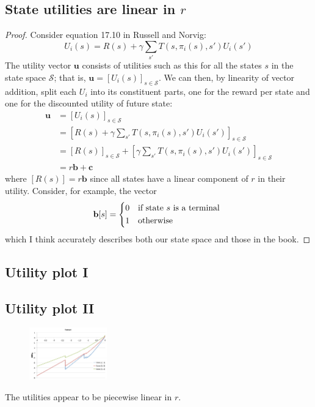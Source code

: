 \documentclass[letterpaper, 10pt]{article}
\begin{document}
\begin{multicols*}{2}
\subsection{State utilities are linear in $r$}
\begin{proof}
Consider equation 17.10 in Russell and Norvig:
\[ U_i(s) = R(s) + \gamma \sum_{s'} T(s, \pi_i(s), s') U_i(s') \]
The utility vector $\mathbf{u}$ consists of utilities such as this for all the states $s$ in the state space $\mathcal{S}$; that is, $\mathbf{u} = [U_i(s)]_{s \in \mathcal{S}}$.
We can then, by linearity of vector addition, split each $U_i$ into its constituent parts, one for the reward per state and one for the discounted utility of future state:
\begin{align*}
\mathbf{u} &= [U_i(s)]_{s \in \mathcal{S}} \\
&= \left[ R(s) + \gamma \sum_{s'} T(s, \pi_i(s), s') U_i(s') \right]_{s \in \mathcal{S}} \\
&= [R(s)]_{s \in \mathcal{S}} + \left[ \gamma \sum_{s'} T(s, \pi_i(s), s') U_i(s') \right]_{s \in \mathcal{S}} \\
&= r\mathbf{b} + \mathbf{c}
\end{align*}
where $[R(s)] = r\mathbf{b}$ since all states have a linear component of $r$ in their utility. 
Consider, for example, the vector
\[
\mathbf{b}[s] = \begin{dcases*}
0 & if state $s$ is a terminal \\
1 & otherwise
\end{dcases*}
\]
which I think accurately describes both our state space and those in the book.
\end{proof}

\subsection{Utility plot I}


\subsection{Utility plot II}
\begin{figure}[h]
	\centering
	\includegraphics[width=0.3\textwidth]{prob15}
	\caption{}
	\label{fig:prob15}
\end{figure}
The utilities appear to be piecewise linear in $r$.


\end{multicols*}
\end{document}
